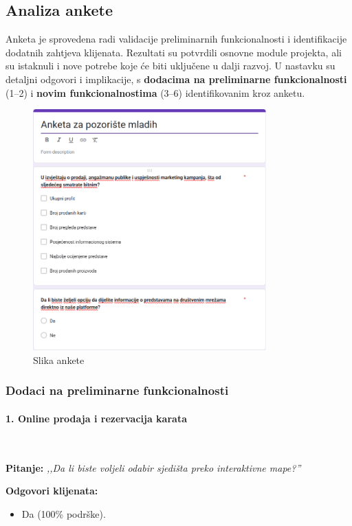 \subsection{Analiza ankete}  
Anketa je sprovedena radi validacije preliminarnih funkcionalnosti i identifikacije dodatnih zahtjeva klijenata. Rezultati su potvrdili osnovne module projekta, ali su istaknuli i nove potrebe koje će biti uključene u dalji razvoj.  
U nastavku su detaljni odgovori i implikacije, s \textbf{dodacima na preliminarne funkcionalnosti} (1–2) i \textbf{novim funkcionalnostima} (3–6) identifikovanim kroz anketu.  

\begin{figure}[htbp]
  \centering 
  \includegraphics[width=0.8\textwidth]{Slike/Anketa.png} 
  \caption{Slika ankete} 
  \label{fig:anketa} 
\end{figure}

\subsubsection*{Dodaci na preliminarne funkcionalnosti}  

\paragraph*{1. Online prodaja i rezervacija karata}~


\textbf{Pitanje:}  
\emph{,,Da li biste voljeli odabir sjedišta preko interaktivne mape?''}  

\textbf{Odgovori klijenata:}  
\begin{itemize}  
    \item Da (100\% podrške).  
\end{itemize}  

